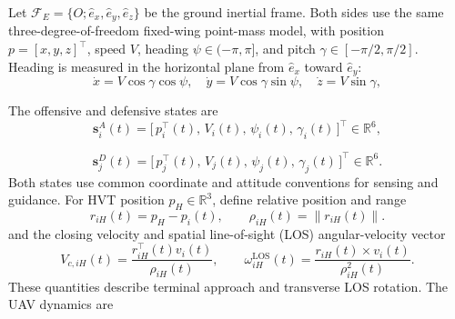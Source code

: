 \documentclass[unbranded]{cja}
\begin{document}
Let $\mathcal{F}_E=\{O;\hat{e}_x,\hat{e}_y,\hat{e}_z\}$ be the ground inertial frame. Both sides use the same three-degree-of-freedom fixed-wing point-mass model, with position $p=[x,y,z]^\top$, speed $V$, heading $\psi\in(-\pi,\pi]$, and pitch $\gamma\in[-\pi/2,\pi/2]$. Heading is measured in the horizontal plane from $\hat e_x$ toward $\hat e_y$:
\begin{equation}
\dot x = V\cos\gamma\cos\psi,\quad
\dot y = V\cos\gamma\sin\psi,\quad
\dot z = V\sin\gamma,
\label{eq:vel-decomp}
\end{equation}

The offensive and defensive states are
\begin{equation}
\mathbf s_i^{A}(t)
=
\bigl[\,p_i^\top(t),\,V_i(t),\,\psi_i(t),\,\gamma_i(t)\,\bigr]^\top
\in\mathbb{R}^{6},
\label{eq:att-state}
\end{equation}

\begin{equation}
\mathbf s_j^{D}(t)
=
\bigl[\,p_j^\top(t),\,V_j(t),\,\psi_j(t),\,\gamma_j(t)\,\bigr]^\top
\in\mathbb{R}^{6}.
\label{eq:def-state}
\end{equation}
Both states use common coordinate and attitude conventions for sensing and guidance.
For HVT position $p_H\in\mathbb{R}^3$, define relative position and range
\begin{equation}
r_{iH}(t)=p_H-p_i(t),\qquad
\rho_{iH}(t)=\|r_{iH}(t)\|.
\label{eq:riH-def}
\end{equation}
and the closing velocity and spatial line-of-sight (LOS) angular-velocity vector
\begin{equation}
V_{c,iH}(t)=\frac{r_{iH}^{\top}(t)v_i(t)}{\rho_{iH}(t)},\qquad
\omega_{iH}^{\mathrm{LOS}}(t)=\frac{r_{iH}(t)\times v_i(t)}{\rho_{iH}^2(t)}.
\label{eq:hvt_kinematics_def}
\end{equation}
These quantities describe terminal approach and transverse LOS rotation. The UAV dynamics are

\end{document}
